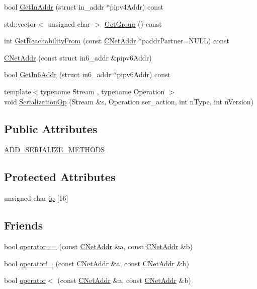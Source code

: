 \begin{DoxyCompactItemize}
\item 
bool \hyperlink{class_c_net_addr_aa2e2c78db01a6a27d6a2740f2ba43e90}{Get\+In\+Addr} (struct in\+\_\+addr $\ast$pipv4\+Addr) const 
\item 
std\+::vector$<$ unsigned char $>$ \hyperlink{class_c_net_addr_af196f306433562cb088dc83fd314a267}{Get\+Group} () const 
\item 
int \hyperlink{class_c_net_addr_a3007deff5e9872d620952362ae0ef144}{Get\+Reachability\+From} (const \hyperlink{class_c_net_addr}{C\+Net\+Addr} $\ast$paddr\+Partner=N\+U\+L\+L) const 
\item 
\hyperlink{class_c_net_addr_a9eae4232457f7659a157467274d1b444}{C\+Net\+Addr} (const struct in6\+\_\+addr \&pipv6\+Addr)
\item 
bool \hyperlink{class_c_net_addr_add7811be50f5fe60c4fa65b461dea98c}{Get\+In6\+Addr} (struct in6\+\_\+addr $\ast$pipv6\+Addr) const 
\item 
{\footnotesize template$<$typename Stream , typename Operation $>$ }\\void \hyperlink{class_c_net_addr_a7c914d155a533f64f8aa0d2f9bfff8a7}{Serialization\+Op} (Stream \&s, Operation ser\+\_\+action, int n\+Type, int n\+Version)
\end{DoxyCompactItemize}
\subsection*{Public Attributes}
\begin{DoxyCompactItemize}
\item 
\hyperlink{class_c_net_addr_ab08e22719f96b42c61e998158a895e5f}{A\+D\+D\+\_\+\+S\+E\+R\+I\+A\+L\+I\+Z\+E\+\_\+\+M\+E\+T\+H\+O\+D\+S}
\end{DoxyCompactItemize}
\subsection*{Protected Attributes}
\begin{DoxyCompactItemize}
\item 
unsigned char \hyperlink{class_c_net_addr_acff7ce68f33f8dfbfe6d79d80928d417}{ip} \mbox{[}16\mbox{]}
\end{DoxyCompactItemize}
\subsection*{Friends}
\begin{DoxyCompactItemize}
\item 
bool \hyperlink{class_c_net_addr_a6cc88956853ab8dc9586d55cda059934}{operator==} (const \hyperlink{class_c_net_addr}{C\+Net\+Addr} \&a, const \hyperlink{class_c_net_addr}{C\+Net\+Addr} \&b)
\item 
bool \hyperlink{class_c_net_addr_ac361eb83c41464359dfb1dfc296c3a4c}{operator!=} (const \hyperlink{class_c_net_addr}{C\+Net\+Addr} \&a, const \hyperlink{class_c_net_addr}{C\+Net\+Addr} \&b)
\item 
bool \hyperlink{class_c_net_addr_af220590d55a24354e2ba2e547e34fd77}{operator$<$} (const \hyperlink{class_c_net_addr}{C\+Net\+Addr} \&a, const \hyperlink{class_c_net_addr}{C\+Net\+Addr} \&b)
\end{DoxyCompactItemize}


